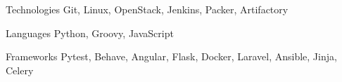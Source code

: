 
\begin{cvskills}
  \cvskill
    {Technologies} %
    {Git, Linux, OpenStack, Jenkins, Packer, Artifactory} %

  \cvskill
    {Languages} %
    {Python, Groovy, JavaScript} %

  \cvskill
    {Frameworks} %
    {
        Pytest,
        Behave,
        Angular,
        Flask,
        Docker,
        Laravel,
        Ansible,
        Jinja,
        Celery
    } %

\end{cvskills}
